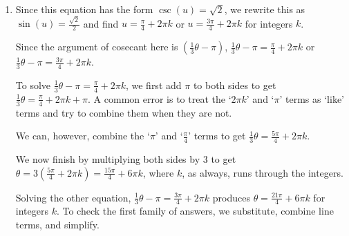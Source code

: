 \documentclass{ximera}
\begin{document}
\begin{example}
\begin{explanation}
\begin{enumerate}
Similarly, we find $\cos\left( 2\left[\frac{7\pi}{12} + \pi k\right]\right) = \cos\left(\frac{7\pi}{6} + 2\pi k\right) = \cos\left(\frac{7\pi}{6}\right) = -\frac{\sqrt{3}}{2}$.  

To determine which of our solutions lie in $[0,2\pi)$, we substitute integer values for $k$.  The solutions we keep come from the values of $k = 0$ and $k =1$ and are  $\theta = \frac{5\pi}{12}$,  $\frac{7\pi}{12}$, $\frac{17\pi}{12}$ and $\frac{19\pi}{12}$.  

Using desmos, we graph $y = \cos(2\theta)$ and $y = -\frac{\sqrt{3}}{2}$ over $[0,2\pi)$ and examine where these two graphs intersect to verify our answers.

\begin{center}
\end{center}


\item  Since this equation has the form $\csc(u) = \sqrt{2}$, we rewrite this as $\sin(u) = \frac{\sqrt{2}}{2}$ and find $u = \frac{\pi}{4} + 2\pi k$ or $u = \frac{3\pi}{4} + 2\pi  k$ for integers $k$.  


Since the argument of cosecant here is $\left(\frac{1}{3}\theta-\pi \right)$,  $\frac{1}{3}\theta-\pi = \frac{\pi}{4} + 2\pi k$ or $\frac{1}{3}\theta - \pi = \frac{3\pi}{4} + 2\pi k$.


To solve $\frac{1}{3} \theta-\pi = \frac{\pi}{4} + 2\pi k$, we first add $\pi$ to both sides to get  $\frac{1}{3} \theta = \frac{\pi}{4} + 2\pi k + \pi$. A common error is to treat the `$2\pi k$' and `$\pi$' terms as `like' terms and try to combine them when they are not.  

 

We can, however, combine the `$\pi$' and `$\frac{\pi}{4}$' terms to get $\frac{1}{3} \theta = \frac{5\pi}{4} + 2\pi k$.

 

We now finish by multiplying both sides by $3$ to get  $\theta  = 3 \left( \frac{5\pi}{4} + 2\pi k \right) = \frac{15 \pi}{4} + 6\pi k$, where $k$, as always, runs through the integers.

 

Solving the other equation, $\frac{1}{3} \theta-\pi = \frac{3\pi}{4} + 2\pi k$ produces $\theta = \frac{21\pi}{4} + 6 \pi k$ for integers $k$. To check the first family of answers, we substitute, combine line terms, and simplify.

\[ \begin{array}{rclr}


\end{array}\]
\end{enumerate}
\end{explanation}
\end{example}
\end{document}
